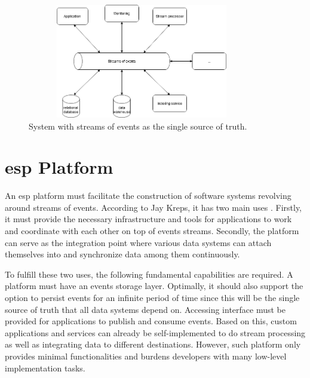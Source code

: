 \begin{figure}[h]
	\centering
	\includegraphics[width=10cm,height=5cm]{images/eventstreamprocessing.png}
	\caption{System with streams of events as the single source of truth.}
	\label{fig:eventstreamprocessingsystem}
\end{figure}




\section{\acrlong{esp} Platform} \label{section:general-ESP-platform}
An \acrshort{esp} platform must facilitate the construction of software systems revolving around streams of events. According to Jay Kreps, it has two main uses \cite{eventstreamingplatform}. Firstly, it must provide the necessary infrastructure and tools for applications to work and coordinate with each other on top of events streams. Secondly, the platform can serve as the integration point where various data systems can attach themselves into and synchronize data among them continuously.

To fulfill these two uses, the following fundamental capabilities are required. A platform must have an events storage layer. Optimally, it should also support the option to persist events for an infinite period of time since this will be the single source of truth that all data systems depend on. Accessing interface must be provided for applications to publish and consume events. Based on this, custom applications and services can already be self-implemented to do stream processing as well as integrating data to different destinations. However, such platform only provides minimal functionalities and burdens developers with many low-level implementation tasks.

